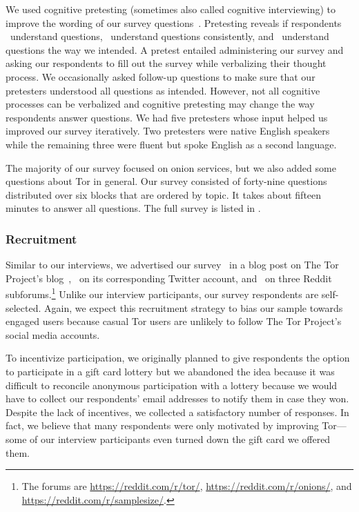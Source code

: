 We used cognitive pretesting (sometimes also called cognitive interviewing) to
improve the wording of our survey questions~\cite{Collins2003a}.  Pretesting
reveals if respondents \first~understand questions, \second~understand questions
consistently, and \third~understand questions the way we intended.  A pretest
entailed administering our survey and asking our respondents to fill out the
survey while verbalizing their thought process.  We occasionally asked follow-up
questions to make sure that our pretesters understood all questions as intended.
However, not all cognitive processes can be verbalized and cognitive pretesting
may change the way respondents answer questions.  We had five pretesters whose
input helped us improved our survey iteratively.  Two pretesters were native
English speakers while the remaining three were fluent but spoke English as a
second language.

The majority of our survey focused on onion services, but we also added some
questions about Tor in general.  Our survey consisted of forty-nine questions
distributed over six blocks that are ordered by topic.  It takes about fifteen
minutes to answer all questions.  The full survey is listed in
.

\subsubsection{Recruitment}

Similar to our interviews, we advertised our survey \first~in a blog post on The
Tor Project's blog~\cite{Winter2017a}, \second~on its corresponding Twitter
account, and \third~on three Reddit subforums.\footnote{The forums are
\url{https://reddit.com/r/tor/}, \url{https://reddit.com/r/onions/}, and
\url{https://reddit.com/r/samplesize/}.}  Unlike our interview participants,
our survey respondents are self-selected.  Again, we expect this recruitment
strategy to bias our sample towards engaged users because casual Tor users are
unlikely to follow The Tor Project's social media accounts.

To incentivize participation, we originally planned to give respondents the
option to participate in a gift card lottery but we abandoned the idea because
it was difficult to reconcile anonymous participation with a lottery because we
would have to collect our respondents' email addresses to notify them in case
they won.  Despite the lack of incentives, we collected a satisfactory number of
responses.  In fact, we believe that many respondents were only motivated by
improving Tor---some of our interview participants even turned down the gift
card we offered them.


